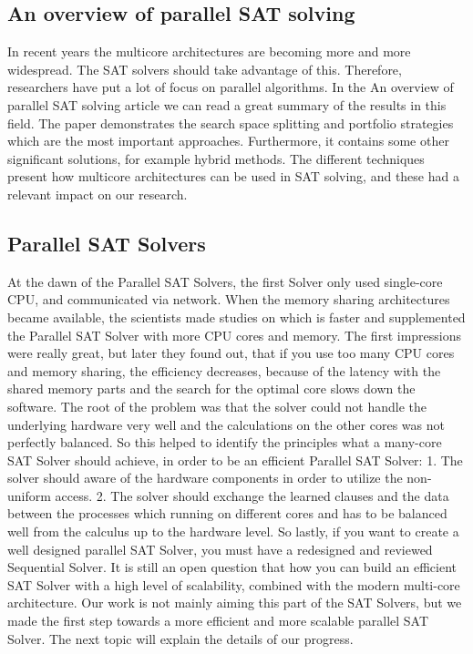 \documentclass{article}
\begin{document}
\subsection{An overview of parallel SAT solving}

In recent years the multicore architectures are becoming more and more wide\-spread. The SAT solvers should take advantage of this. Therefore, researchers have put a lot of focus on parallel algorithms. In the An overview of parallel SAT solving article we can read a great summary of the results in this field. The paper demonstrates the search space splitting and portfolio strategies which are the most important approaches. Furthermore, it contains some other significant solutions, for example hybrid methods. The different techniques present how multicore architectures can be used in SAT solving, and these had a relevant impact on our research.


\subsection{Parallel SAT Solvers}

At the dawn of the Parallel SAT Solvers, the first Solver only used single-core CPU, and communicated via network. When the memory sharing architectures became available, the scientists made studies on which is faster and supplemented the Parallel SAT Solver with more CPU cores and memory. The first impressions were really great, but later they found out, that if you use too many CPU cores and memory sharing, the efficiency decreases, because of the latency with the shared memory parts and the search for the optimal core slows down the software. The root of the problem was that the solver could not handle the underlying hardware very well and the calculations on the other cores was not perfectly balanced. So this helped to identify the principles what a many-core SAT Solver should achieve, in order to be an efficient Parallel SAT Solver:
1. The solver should aware of the hardware components in order to utilize the non-uniform access.
2. The solver should exchange the learned clauses and the data between the processes which running on different cores and has to be balanced well from the calculus up to the hardware level.
So lastly, if you want to create a well designed parallel SAT Solver, you must have a redesigned and reviewed Sequential Solver. It is still an open question that how you can build an efficient SAT Solver with a high level of scalability, combined with the modern multi-core architecture.
Our work is not mainly aiming this part of the SAT Solvers, but we made the first step towards a more efficient and more scalable parallel SAT Solver. The next topic will explain the details of our progress.
\end{document}
